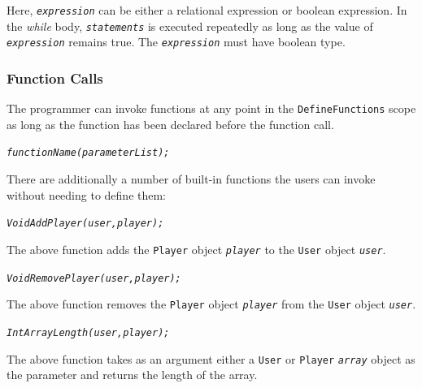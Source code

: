 \documentclass[12pt]{report}
\begin{document}
Here, \textit{\texttt{expression}} can be either a relational expression or boolean expression. In the \textit{while} body, \textit{\texttt{statements}} is executed repeatedly as long as the value of \textit{\texttt{expression}} remains true. The \textit{\texttt{expression}} must have boolean type.

\subsubsection{Function Calls}

The programmer can invoke functions at any point in the \texttt{DefineFunctions} scope as long as the function has been declared before the function call. 

\begin{alltt}\begin{singlespace}
            \textit{functionName(parameterList);}\end{singlespace}
\end{alltt}

There are additionally a number of built-in functions the users can invoke without needing to define them:

\begin{alltt}\begin{singlespace}
            \textit{Void AddPlayer(user, player);}\end{singlespace}
\end{alltt}

The above function adds the \texttt{Player} object \textit{\texttt{player}} to the \texttt{User} object \textit{\texttt{user}}.

\begin{alltt}\begin{singlespace}
            \textit{Void RemovePlayer(user, player);}\end{singlespace}
\end{alltt}

The above function removes the \texttt{Player} object \textit{\texttt{player}} from the \texttt{User} object \textit{\texttt{user}}.

\begin{alltt}\begin{singlespace}
            \textit{Int ArrayLength(user, player);}\end{singlespace}
\end{alltt}

The above function takes as an argument either a \texttt{User} or \texttt{Player} \textit{\texttt{array}} object as the parameter and returns the length of the array.
\end{document}
